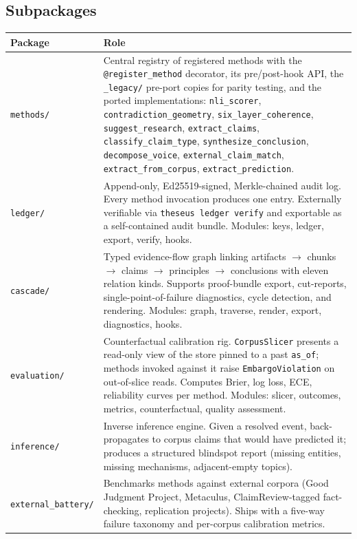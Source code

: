 \documentclass[11pt,letterpaper]{article}
\newcommand{\file}[1]{\texttt{#1}}
\begin{document}
\subsection{Subpackages}

\begin{longtable}{p{2.6cm} p{12cm}}
\toprule
\textbf{Package} & \textbf{Role} \\
\midrule
\endhead
\file{methods/}       & Central registry of registered methods with the \texttt{@register\_method} decorator, its pre/post-hook API, the \file{\_legacy/} pre-port copies for parity testing, and the ported implementations: \texttt{nli\_scorer}, \texttt{contradiction\_geometry}, \texttt{six\_layer\_coherence}, \texttt{suggest\_research}, \texttt{extract\_claims}, \texttt{classify\_claim\_type}, \texttt{synthesize\_conclusion}, \texttt{decompose\_voice}, \texttt{external\_claim\_match}, \texttt{extract\_from\_corpus}, \texttt{extract\_prediction}. \\
\file{ledger/}        & Append-only, Ed25519-signed, Merkle-chained audit log. Every method invocation produces one entry. Externally verifiable via \texttt{theseus ledger verify} and exportable as a self-contained audit bundle. Modules: keys, ledger, export, verify, hooks. \\
\file{cascade/}       & Typed evidence-flow graph linking artifacts $\to$ chunks $\to$ claims $\to$ principles $\to$ conclusions with eleven relation kinds. Supports proof-bundle export, cut-reports, single-point-of-failure diagnostics, cycle detection, and rendering. Modules: graph, traverse, render, export, diagnostics, hooks. \\
\file{evaluation/}    & Counterfactual calibration rig. \texttt{CorpusSlicer} presents a read-only view of the store pinned to a past \texttt{as\_of}; methods invoked against it raise \texttt{EmbargoViolation} on out-of-slice reads. Computes Brier, log loss, ECE, reliability curves per method. Modules: slicer, outcomes, metrics, counterfactual, quality assessment. \\
\file{inference/}     & Inverse inference engine. Given a resolved event, back-propagates to corpus claims that would have predicted it; produces a structured blindspot report (missing entities, missing mechanisms, adjacent-empty topics). \\
\file{external\_battery/} & Benchmarks methods against external corpora (Good Judgment Project, Metaculus, ClaimReview-tagged fact-checking, replication projects). Ships with a five-way failure taxonomy and per-corpus calibration metrics. \\

\end{longtable}
\end{document}
